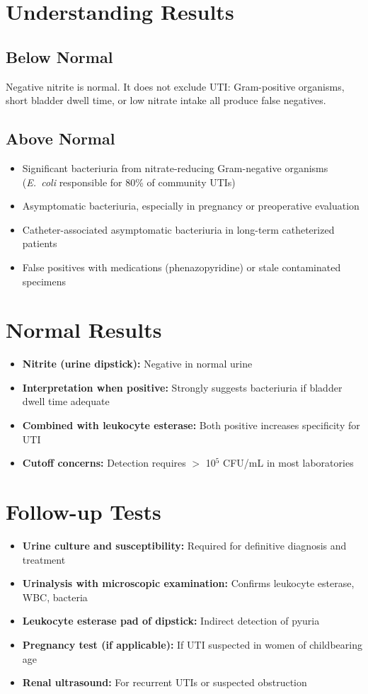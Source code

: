 \section*{Understanding Results}

\subsection*{Below Normal}
Negative nitrite is normal. It does not exclude UTI: Gram-positive organisms, short bladder dwell time, or low nitrate intake all produce false negatives.

\subsection*{Above Normal}
\begin{itemize}
  \item Significant bacteriuria from nitrate-reducing Gram-negative organisms (\textit{E.\ coli} responsible for 80\% of community UTIs)
  \item Asymptomatic bacteriuria, especially in pregnancy or preoperative evaluation
  \item Catheter-associated asymptomatic bacteriuria in long-term catheterized patients
  \item False positives with medications (phenazopyridine) or stale contaminated specimens
\end{itemize}

\section*{Normal Results}
\begin{itemize}
  \item \textbf{Nitrite (urine dipstick):} Negative in normal urine
  \item \textbf{Interpretation when positive:} Strongly suggests bacteriuria if bladder dwell time adequate
  \item \textbf{Combined with leukocyte esterase:} Both positive increases specificity for UTI
  \item \textbf{Cutoff concerns:} Detection requires $>$ 10$^5$ CFU/mL in most laboratories
\end{itemize}

\section*{Follow-up Tests}
\begin{itemize}
  \item \textbf{Urine culture and susceptibility:} Required for definitive diagnosis and treatment
  \item \textbf{Urinalysis with microscopic examination:} Confirms leukocyte esterase, WBC, bacteria
  \item \textbf{Leukocyte esterase pad of dipstick:} Indirect detection of pyuria
  \item \textbf{Pregnancy test (if applicable):} If UTI suspected in women of childbearing age
  \item \textbf{Renal ultrasound:} For recurrent UTIs or suspected obstruction
\end{itemize}

